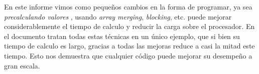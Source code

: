 En este informe vimos como pequeños cambios en la forma de programar, ya sea \textit{precalculando
valores} , usando \textit{array merging}, \textit{blocking}, etc. puede mejorar considerablemente el
tiempo de calculo y reducir la carga sobre el procesador. En el documento tratan todas estas técnicas en
un único ejemplo, que si bien su tiempo de calculo es largo, gracias a todas las mejoras reduce a casi la
mitad este tiempo. Esto nos demuestra que cualquier código puede mejorar su desempeño a gran escala.
